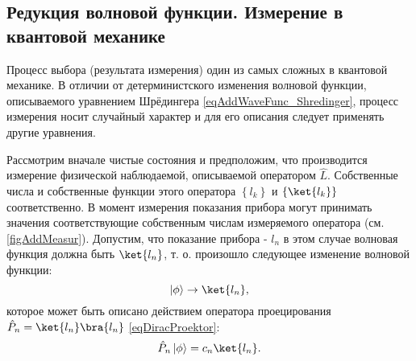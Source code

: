 
\subsection{Редукция волновой функции. Измерение в квантовой механике}
\label{sec:add:reduction}

Процесс выбора (результата измерения) один из самых сложных в
квантовой механике. В отличии от детерминистского изменения волновой
функции, описываемого уравнением Шрёдингера
\eqref{eqAddWaveFunc_Shredinger}, процесс измерения носит случайный
характер и для его описания следует применять другие уравнения. 



Рассмотрим вначале чистые состояния 
и предположим, что производится
измерение физической наблюдаемой, 
описываемой оператором $\hat{L}$. Собственные числа и собственные
функции этого оператора $\left\{ l_k \right\}$ и 
$\left\{ \ket{l_k} \right\}$ соответственно. В момент
измерения показания прибора могут принимать значения соответствующие
собственным числам измеряемого оператора
(см. \autoref{figAddMeasur}). Допустим, что показание 
прибора - $l_n$ в этом случае волновая функция должна быть 
$\ket{l_n}$, т. о. произошло следующее
изменение волновой функции:
\[
\left| \phi \right> \rightarrow \ket{l_n},
\] 
которое может быть описано действием оператора проецирования 
$\hat{P}_n = \ket{l_n} \bra{l_n}$ \eqref{eqDiracProektor}:
\[
\hat{P}_n \left| \phi \right> = c_n\ket{l_n}.
\]

